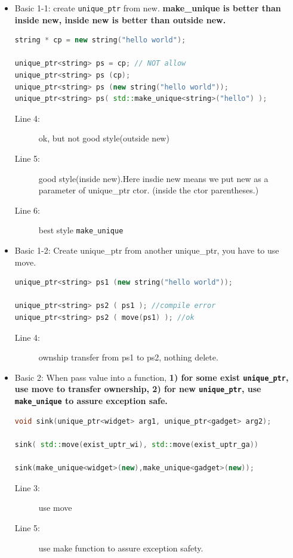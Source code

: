 \documentclass[a4paper,11pt,twoside]{book}
\begin{document}
\begin{itemize}

\item Basic 1-1: create \texttt{unique\_ptr} from new. \textbf{make\_unique is better than inside new, inside new is better than outside new.}
\begin{lstlisting}[frame=single, language=c++]
string * cp = new string("hello world");

unique_ptr<string> ps = cp; // NOT allow
unique_ptr<string> ps (cp);
unique_ptr<string> ps (new string("hello world"));
unique_ptr<string> ps( std::make_unique<string>("hello") );
\end{lstlisting}
\begin{description}
	\item[Line 4:] ok, but not good style(outside new)
	\item[Line 5:] good style(inside new).Here insdie new means we put new as a parameter of unique\_ptr ctor. (inside the ctor parentheses.)
	\item[Line 6:] best style \texttt{make\_unique}
\end{description}

\item Basic 1-2: Create unique\_ptr from another unique\_ptr, you have to use move.
\begin{lstlisting}[frame=single, language=c++]
unique_ptr<string> ps1 (new string("hello world"));

unique_ptr<string> ps2 ( ps1 ); //compile error
unique_ptr<string> ps2 ( move(ps1) ); //ok
\end{lstlisting}
\begin{description}
	\item[Line 4:] ownship transfer from ps1 to ps2, nothing delete.
\end{description}

\item Basic 2: When pass value into a function, \textbf{1) for some exist \texttt{unique\_ptr}, use move to transfer ownership, 2) for new \texttt{unique\_ptr}, use \texttt{make\_unique} to assure exception safe.}

\begin{lstlisting}[frame=single, language=c++]
void sink(unique_ptr<widget> arg1, unique_ptr<gadget> arg2);

sink( std::move(exist_uptr_wi), std::move(exist_uptr_ga))

sink(make_unique<widget>(new),make_unique<gadget>(new));  
\end{lstlisting}
\begin{description}
	\item[Line 3:] use move
	\item[Line 5:] use make function to assure exception safety.
\end{description}



\end{itemize}
\end{document}
